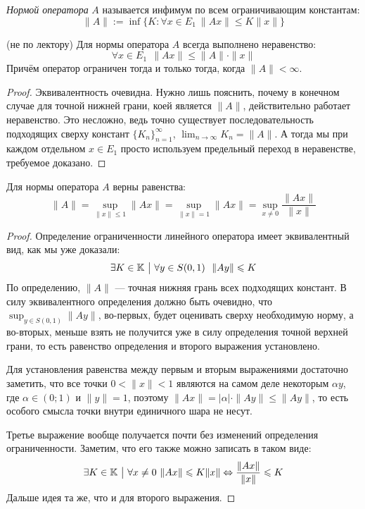 \begin{definition}
	\textit{Нормой оператора} $A$ называется инфимум по всем ограничивающим константам:
	\[
		\|A\| := \inf \{K \colon \forall x \in E_1\ \|Ax\| \le K\|x\|\}
	\]
\end{definition}

\begin{proposition} (не по лектору)
	Для нормы оператора $A$ всегда выполнено неравенство:
	\[
		\forall x \in E_1\ \ \|Ax\| \le \|A\| \cdot \|x\|
	\]
	Причём оператор ограничен тогда и только тогда, когда $\|A\| < \infty$.
\end{proposition}

\begin{proof}
	Эквивалентность очевидна. Нужно лишь пояснить, почему в конечном случае для точной нижней грани, коей является $\|A\|$, действительно работает неравенство. Это несложно, ведь точно существует последовательность подходящих сверху констант $\{K_n\}_{n = 1}^\infty$, $\lim_{n \to \infty} K_n = \|A\|$. А тогда мы при каждом отдельном $x \in E_1$ просто используем предельный переход в неравенстве, требуемое доказано.
\end{proof}

\begin{proposition}
	Для нормы оператора $A$ верны равенства:
	\[
		\|A\| = \sup_{\|x\| \le 1} \|Ax\| = \sup_{\|x\| = 1} \|Ax\| = \sup_{x \neq 0} \frac{\|Ax\|}{\|x\|}
	\]
\end{proposition}

\begin{proof}
	Определение ограниченности линейного оператора имеет эквивалентный вид, как мы уже доказали:
	\[
		\exists K \in \K \such \forall y \in S(0, 1)\ \ \|Ay\| \le K
	\]
	По определению, $\|A\|$ --- точная нижняя грань всех подходящих констант. В силу эквивалентного определения должно быть очевидно, что $\sup_{y \in S(0, 1)} \|Ay\|$, во-первых, будет оценивать сверху необходимую норму, а во-вторых, меньше взять не получится уже в силу определения точной верхней грани, то есть равенство определения и второго выражения установлено.
	
	Для установления равенства между первым и вторым выражениями достаточно заметить, что все точки $0 < \|x\| < 1$ являются на самом деле некоторым $\alpha y$, где $\alpha \in (0; 1)$ и $\|y\| = 1$, поэтому $\|Ax\| = |\alpha| \cdot \|Ay\| \le \|Ay\|$, то есть особого смысла точки внутри единичного шара не несут.
	
	Третье выражение вообще получается почти без изменений определения ограниченности. Заметим, что его также можно записать в таком виде:
	\[
		\exists K \in \K \such \forall x \neq 0\ \|Ax\| \le K\|x\| \Lra \frac{\|Ax\|}{\|x\|} \le K
	\]
	Дальше идея та же, что и для второго выражения.
\end{proof}

